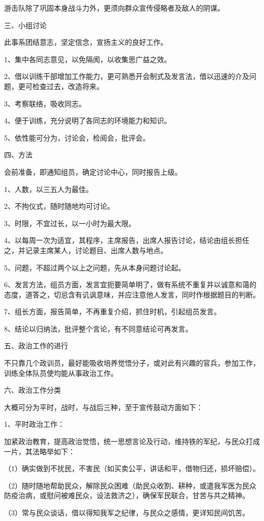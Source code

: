 游击队除了巩固本身战斗力外，更须向群众宣传侵略者及敌人的阴谋。

三、小组讨论

此事系团结意志，坚定信念，宣扬主义的良好工作。

1、集中各同志意见，以免隔阂，以收集思广益之效。

2、借以训练干部增加工作能力，更可熟悉开会制式及发言法，借以迅速的介及问题，更可检查过去，改造将来。

3、考察联络，吸收同志。

4、便于训练，充分说明了各同志的环境能力和知识。

5、依性能可分为，讨论会，检阅会，批评会。

四、方法

会前准备，即通知组员，确定讨论中心，同时报告上级。

1、人数，以三五人为最佳。

2、不拘仪式，随时随地均可讨论。

3、时限，不宜过长，以一小时为最大限。

4、以每周一次为适宜，其程序，主席报告，出席人报告讨论，结论由组长担任之，并记录主席某人，讨论题目、出席人数与地点。

5、问题，不超过两个以上之问题，先从本身问题讨论起。

6、发言方法，组员方面，发言宜扼要简单明了，做有系统不重复并以诚意和蔼的态度，道答之，切忌含有讥讽意味，并应注意他人发言，同时作根据题目的判断。

7、组长方面，报告简单，不再重复介绍，抓住时机，引起组员发言。

8、结论以归纳法，批评整个言论，有不同意结论可再发言。

五、政治工作的进行

不只靠几个政训员，最好能吸收培养觉悟分子，或对此有兴趣的官兵，参加工作，训练全体队员使均能从事政治工作。

六、政治工作分类

大概可分为平时，战时，与战后三种，至于宣传鼓动方面如下：

1、平时政治工作：

加紧政治教育，提高政治觉悟，统一思想言论及行动，维持铁的军纪，与民众打成一片，其法略举如下：

（1）确实做到不扰民，不害民（如买卖公平，讲话和平，借物归还，损坏赔偿）。

（2）随时随地帮助民众，解除民众困难（助民众收割、耕种，或遣我军医为民众防疫治病，或慰问被难民众，设法救济之），确保军民联合，甘苦与共之精神。

（3）常与民众谈话，借以得知我军之纪律，与民众之感情，更详知民间饥苦。

